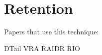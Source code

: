 \section{Retention}
\label{sec:ret}
Papers that use this technique:

DTail\cite{dtail}
VRA
RAIDR
RIO\cite{rioparis}